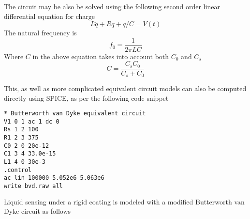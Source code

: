 The circuit may be also be solved using the following second order linear
differential equation for charge
\begin{equation}
 L\ddot{q}+R\dot{q}+q/C = V(t)
\end{equation}
The natural frequency is
\begin{equation}
 f_0 = \frac{1}{2 \pi L C}
\end{equation}
Where $C$ in the above equation takes into account both $C_0$ and $C_s$
\begin{equation}
 C = \frac{C_s C_0}{C_s + C_0}
\end{equation}

This, as well as more complicated equivalent circuit models can also be
computed directly using SPICE, as per the following code snippet
\begin{verbatim}
* Butterworth van Dyke equivalent circuit
V1 0 1 ac 1 dc 0
Rs 1 2 100
R1 2 3 375
C0 2 0 20e-12
C1 3 4 33.0e-15
L1 4 0 30e-3
.control
ac lin 100000 5.052e6 5.063e6
write bvd.raw all
\end{verbatim}

Liquid sensing under a rigid coating is modeled with a modified Butterworth
van Dyke circuit as follows

\begin{center}
\end{center}



